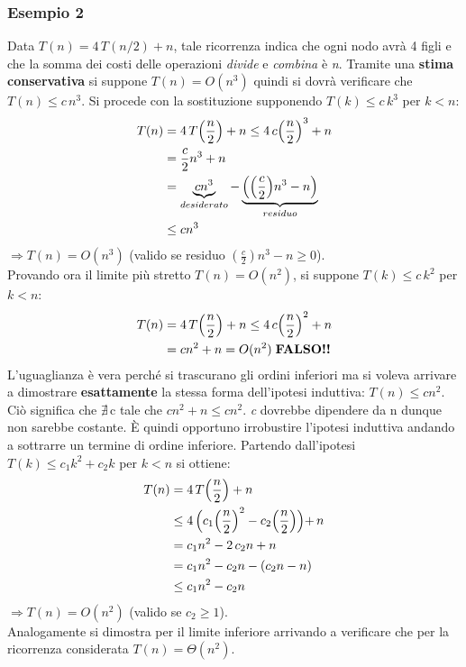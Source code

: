 \documentclass[10pt, a4paper]{report}
\begin{document}
\subsubsection{Esempio 2}
Data $T(n) = 4\,T(n/2) + n$, tale ricorrenza indica che ogni nodo avrà 4 figli e che la somma dei costi delle operazioni \textsl{divide} e \textsl{combina} è \textit{n}. Tramite una \textbf{stima conservativa} si suppone $T(n) = O(n^3)$ quindi si dovrà verificare che $T(n) \leq c\,n^3$. Si procede con la sostituzione supponendo $T(k) \leq c\,k^3$ per $k < n$:
\begin{align*}
T(n) &= 4\,T\Bigl(\frac{n}{2}\Bigr) + n \leq 4\,c\Bigl(\frac{n}{2}\Bigr)^3 + n \\
&= \frac{c}{2}n^3 + n \\
&= \underbrace{cn^3}_{desiderato} - \underbrace{\Bigl(\Bigl(\frac{c}{2}\Bigr)n^3 - n\Bigr)}_{residuo} \\
&\leq cn^3
\end{align*}
$\Rightarrow T(n) = O(n^3)$ (valido se residuo $(\frac{c}{2})n^3 - n \geq 0$).\\Provando ora il limite più stretto $T(n) = O(n^2)$, si suppone $T(k) \leq c\,k^2$ per $k < n$:
\begin{align*}
T(n) &= 4\,T\Bigl(\frac{n}{2}\Bigr) + n \leq 4\,c\Bigl(\frac{n}{2}\Bigr)^2 + n \\
&= cn^2 + n = O(n^2) \;\textbf{FALSO!!}
\end{align*}
L'uguaglianza è vera perché si trascurano gli ordini inferiori ma si voleva arrivare a dimostrare \textbf{esattamente} la stessa forma dell'ipotesi induttiva: $T(n) \leq cn^2$. Ciò significa che $\nexists$\,c tale che $cn^2 + n \leq cn^2$. \textit{c} dovrebbe dipendere da n dunque non sarebbe costante. È quindi opportuno irrobustire l'ipotesi induttiva andando a sottrarre un termine di ordine inferiore. Partendo dall'ipotesi $T(k) \leq c_1k^2 + c_2k$ per $k < n$ si ottiene:
\begin{align*}
T(n) &= 4\,T\Bigl(\frac{n}{2}\Bigr) + n \\
&\leq 4\,\Bigl(c_1\Bigl(\frac{n}{2}\Bigr)^2 - c_2\Bigl(\frac{n}{2}\Bigr)\Bigl) + \,n\\
&= c_1n^2 - 2\,c_2n + n \\
&= c_1n^2 - c_2n - (c_2n - n) \\
&\leq c_1n^2 - c_2n
\end{align*}
$\Rightarrow T(n) = O(n^2)$ (valido se $c_2 \geq 1$).\\Analogamente si dimostra per il limite inferiore arrivando a verificare che per la ricorrenza considerata $T(n) = \Theta(n^2)$.
\end{document}
